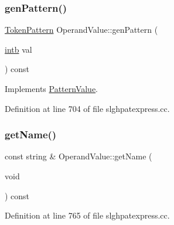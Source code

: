 \mbox{\label{class_operand_value_ab0c4823f1e2e5f9a26a403dce82f4310}} 
\subsubsection{\texorpdfstring{genPattern()}{genPattern()}}
{\footnotesize\ttfamily \mbox{\hyperlink{class_token_pattern}{Token\+Pattern}} Operand\+Value\+::gen\+Pattern (\begin{DoxyParamCaption}\item[{\mbox{\hyperlink{types_8h_aa925ba3e627c2df89d5b1cfe84fb8572}{intb}}}]{val }\end{DoxyParamCaption}) const\hspace{0.3cm}{\ttfamily [virtual]}}



Implements \mbox{\hyperlink{class_pattern_value_acc5a0c3b740a93e6ed5d3882c960ef98}{Pattern\+Value}}.



Definition at line 704 of file slghpatexpress.\+cc.

\mbox{\label{class_operand_value_ade99629239e3381551cf0872c6ed31e4}} 
\subsubsection{\texorpdfstring{getName()}{getName()}}
{\footnotesize\ttfamily const string \& Operand\+Value\+::get\+Name (\begin{DoxyParamCaption}\item[{void}]{ }\end{DoxyParamCaption}) const}



Definition at line 765 of file slghpatexpress.\+cc.

